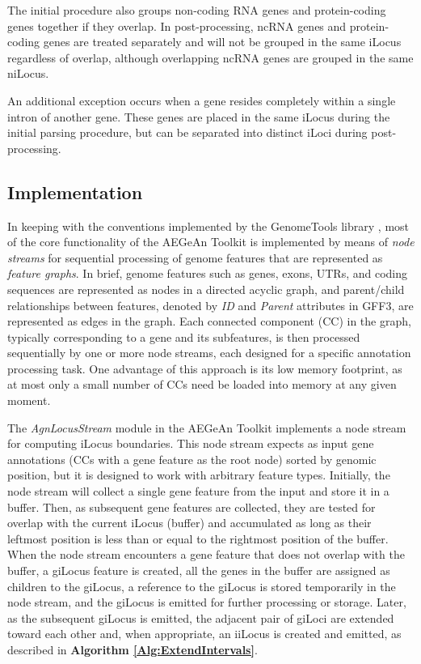 The initial procedure also groups non-coding RNA genes and protein-coding genes together if they overlap.
In post-processing, ncRNA genes and protein-coding genes are treated separately and will not be grouped in the same iLocus regardless of overlap, although overlapping ncRNA genes are grouped in the same niLocus.

An additional exception occurs when a gene resides completely within a single intron of another gene.
These genes are placed in the same iLocus during the initial parsing procedure, but can be separated into distinct iLoci during post-processing.


\subsection{Implementation}
In keeping with the conventions implemented by the GenomeTools library \cite{GenomeTools}, most of the core functionality of the AEGeAn Toolkit \cite{AEGeAn} is implemented by means of \textit{node streams} for sequential processing of genome features that are represented as \textit{feature graphs}.
In brief, genome features such as genes, exons, UTRs, and coding sequences are represented as nodes in a directed acyclic graph, and parent/child relationships between features, denoted by \textit{ID} and \textit{Parent} attributes in GFF3, are represented as edges in the graph.
Each connected component (CC) in the graph, typically corresponding to a gene and its subfeatures, is then processed sequentially by one or more node streams, each designed for a specific annotation processing task.
One advantage of this approach is its low memory footprint, as at most only a small number of CCs need be loaded into memory at any given moment.

The \textit{AgnLocusStream} module in the AEGeAn Toolkit implements a node stream for computing iLocus boundaries.
This node stream expects as input gene annotations (CCs with a gene feature as the root node) sorted by genomic position, but it is designed to work with arbitrary feature types.
Initially, the node stream will collect a single gene feature from the input and store it in a buffer.
Then, as subsequent gene features are collected, they are tested for overlap with the current iLocus (buffer) and accumulated as long as their leftmost position is less than or equal to the rightmost position of the buffer.
When the node stream encounters a gene feature that does not overlap with the buffer, a giLocus feature is created, all the genes in the buffer are assigned as children to the giLocus, a reference to the giLocus is stored temporarily in the node stream, and the giLocus is emitted for further processing or storage.
Later, as the subsequent giLocus is emitted, the adjacent pair of giLoci are extended toward each other and, when appropriate, an iiLocus is created and emitted, as described in \textbf{Algorithm \ref{Alg:ExtendIntervals}}.

